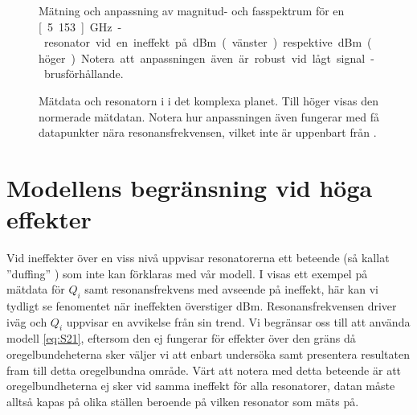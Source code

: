 \documentclass[main.tex]{subfiles}
\begin{document}
\begin{figure}[H]
    \centering
    \begin{subfigure}[t]{0.45\textwidth}
        \centerfloat
        \setlength{}
        \setlength\figureheight{12em}
        
    \end{subfigure}
    \begin{subfigure}[t]{0.45\textwidth}
        \centerfloat
        \setlength{}
        \setlength\figureheight{12em}
        
    \end{subfigure}
    \caption{Mätning och anpassning av magnitud- och fasspektrum för en \unit[5.153]{GHz}-resonator vid en ineffekt på \unit[-40]{dBm} (vänster) respektive \unit[-70]{dBm} (höger). Notera att anpassningen även är robust vid lågt signal-brusförhållande.}
    \label{fig:ex_magphs_resonator}
\end{figure}

\begin{figure}[H]
    \centering
    \begin{subfigure}[t]{0.375\textwidth}
        \centerfloat
        \setlength{}
        \setlength\figureheight{10em}
        
    \end{subfigure}
    \begin{subfigure}[t]{0.375\textwidth}
        \centerfloat
        \setlength{}
        \setlength\figureheight{10em}
        
    \end{subfigure}
    \caption{Mätdata och resonatorn i  i det komplexa planet. Till höger visas den normerade mätdatan. Notera hur anpassningen även fungerar med få datapunkter nära resonansfrekvensen, vilket inte är uppenbart från . }
    \label{fig:ex_cmplx_resonator}
\end{figure}

\section{Modellens begränsning vid höga effekter}
Vid ineffekter över en viss nivå uppvisar resonatorerna ett beteende (så kallat ''duffing'' \cite{tholen2007}) som inte kan förklaras med vår modell. I  visas ett exempel på mätdata för $Q_i$ samt resonansfrekvens med avseende på ineffekt, här kan vi tydligt se fenomentet när ineffekten överstiger \unit[-70]{dBm}. Resonansfrekvensen driver iväg och $Q_i$ uppvisar en avvikelse från sin trend. Vi begränsar oss till att använda modell \ref{eq:S21}, eftersom den ej fungerar för effekter över den gräns då oregelbundeheterna sker väljer vi att enbart undersöka samt presentera resultaten fram till detta oregelbundna område. Värt att notera med detta beteende är att oregelbundheterna ej sker vid samma ineffekt för alla resonatorer, datan måste alltså kapas på olika ställen beroende på vilken resonator som mäts på.
\end{document}
